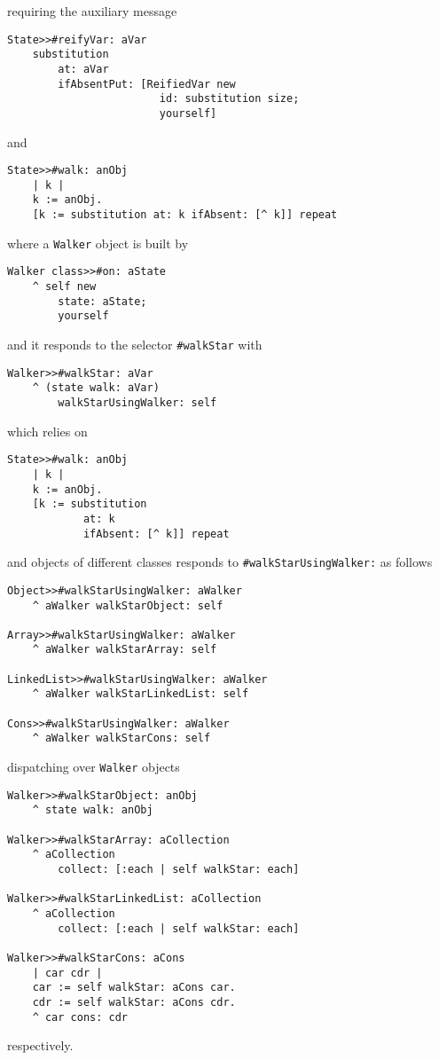 \documentclass[a4paper,11pt]{article}
\begin{document}
requiring the auxiliary message
\begin{verbatim}
State>>#reifyVar: aVar 
    substitution
        at: aVar
        ifAbsentPut: [ReifiedVar new 
                        id: substitution size; 
                        yourself]
\end{verbatim}
and
\begin{verbatim}
State>>#walk: anObj 
    | k |
    k := anObj.
    [k := substitution at: k ifAbsent: [^ k]] repeat
\end{verbatim}

\hrulefill

where a \Verb|Walker| object is built by
\begin{verbatim}
Walker class>>#on: aState
    ^ self new
        state: aState;
        yourself
\end{verbatim}
and it responds to the selector \Verb|#walkStar| with
\begin{verbatim}
Walker>>#walkStar: aVar
    ^ (state walk: aVar)
        walkStarUsingWalker: self
\end{verbatim}
which relies on
\begin{verbatim}
State>>#walk: anObj
    | k |
    k := anObj.
    [k := substitution
            at: k
            ifAbsent: [^ k]] repeat
\end{verbatim}
and objects of different classes responds to \Verb|#walkStarUsingWalker:| as follows
\begin{verbatim}
Object>>#walkStarUsingWalker: aWalker
    ^ aWalker walkStarObject: self

Array>>#walkStarUsingWalker: aWalker
    ^ aWalker walkStarArray: self

LinkedList>>#walkStarUsingWalker: aWalker
    ^ aWalker walkStarLinkedList: self

Cons>>#walkStarUsingWalker: aWalker
    ^ aWalker walkStarCons: self
\end{verbatim}
dispatching over \Verb|Walker| objects
\begin{verbatim}
Walker>>#walkStarObject: anObj
    ^ state walk: anObj

Walker>>#walkStarArray: aCollection
    ^ aCollection
        collect: [:each | self walkStar: each]

Walker>>#walkStarLinkedList: aCollection
    ^ aCollection
        collect: [:each | self walkStar: each]

Walker>>#walkStarCons: aCons
    | car cdr |
    car := self walkStar: aCons car.
    cdr := self walkStar: aCons cdr.
    ^ car cons: cdr
\end{verbatim}
respectively.
\end{document}
